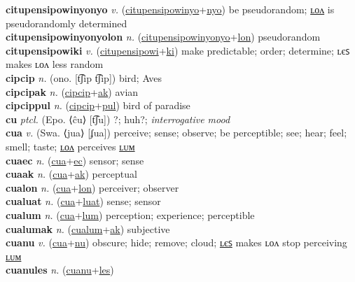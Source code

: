 \textbf{citupensipowinyonyo} \textit{v.} (\hyperref[citupensipowinyo]{citupensipowinyo}+\hyperref[nyo]{nyo})
be pseudorandom; \hyperref[citupensipowinyonyolon]{ʟᴏᴧ} is pseudorandomly determined \label{citupensipowinyonyo} \\
\textbf{citupensipowinyonyolon} \textit{n.} (\hyperref[citupensipowinyonyo]{citupensipowinyonyo}+\hyperref[lon]{lon})
pseudorandom \label{citupensipowinyonyolon} \\
\textbf{citupensipowiki} \textit{v.} (\hyperref[citupensipowi]{citupensipowi}+\hyperref[ki]{ki})
make predictable; order; determine; ʟєꜱ makes ʟᴏᴧ less random \label{citupensipowiki} \\
\textbf{cipcip} \textit{n.} (ono. [t͡ʃip t͡ʃip])
bird; Aves \label{cipcip} \\
\textbf{cipcipak} \textit{n.} (\hyperref[cipcip]{cipcip}+\hyperref[ak]{ak})
avian \label{cipcipak} \\
\textbf{cipcippul} \textit{n.} (\hyperref[cipcip]{cipcip}+\hyperref[pul]{pul})
bird of paradise \label{cipcippul} \\
\textbf{cu} \textit{ptcl.} (Epo. ⟨ĉu⟩ [t͡ʃu])
?; huh?; \textit{interrogative mood} \label{cu} \\
\textbf{cua} \textit{v.} (Swa. ⟨jua⟩ [ʄua])
perceive; sense; observe; be perceptible; see; hear; feel; smell; taste; \hyperref[cualon]{ʟᴏᴧ} perceives \hyperref[cualum]{ʟᴜᴍ} \label{cua} \\
\textbf{cuaec} \textit{n.} (\hyperref[cua]{cua}+\hyperref[ec]{ec})
sensor; sense \label{cuaec} \\
\textbf{cuaak} \textit{n.} (\hyperref[cua]{cua}+\hyperref[ak]{ak})
perceptual \label{cuaak} \\
\textbf{cualon} \textit{n.} (\hyperref[cua]{cua}+\hyperref[lon]{lon})
perceiver; observer \label{cualon} \\
\textbf{cualuat} \textit{n.} (\hyperref[cua]{cua}+\hyperref[luat]{luat})
sense; sensor \label{cualuat} \\
\textbf{cualum} \textit{n.} (\hyperref[cua]{cua}+\hyperref[lum]{lum})
perception; experience; perceptible \label{cualum} \\
\textbf{cualumak} \textit{n.} (\hyperref[cualum]{cualum}+\hyperref[ak]{ak})
subjective \label{cualumak} \\
\textbf{cuanu} \textit{v.} (\hyperref[cua]{cua}+\hyperref[nu]{nu})
obscure; hide; remove; cloud; \hyperref[cuanules]{ʟєꜱ} makes ʟᴏᴧ stop perceiving \hyperref[cuanulum]{ʟᴜᴍ} \label{cuanu} \\
\textbf{cuanules} \textit{n.} (\hyperref[cuanu]{cuanu}+\hyperref[les]{les})
